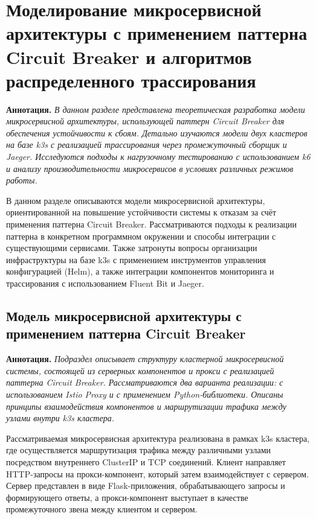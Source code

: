 \chapter{Моделирование микросервисной архитектуры с применением паттерна Circuit Breaker и алгоритмов распределенного трассирования}

\textbf{Аннотация.} \textit{В  данном разделе представлена теоретическая разработка модели микросервисной архитектуры, использующей паттерн Circuit Breaker для обеспечения устойчивости к сбоям. Детально изучаются модели двух кластеров на базе k3s с реализацией трассирования через промежуточный сборщик и Jaeger. Исследуются подходы к нагрузочному тестированию с использованием k6 и анализу производительности микросервисов в условиях различных режимов работы.}

В данном разделе описываются модели микросервисной архитектуры, ориентированной на повышение устойчивости системы к отказам за счёт применения паттерна Circuit Breaker. Рассматриваются подходы к реализации паттерна в конкретном программном окружении и способы интеграции с существующими сервисами. Также затронуты вопросы организации инфраструктуры на базе k3s с применением инструментов управления конфигурацией (Helm), а также интеграции компонентов мониторинга и трассирования с использованием Fluent Bit и Jaeger. 

  
\section{Модель микросервисной архитектуры с применением паттерна Circuit Breaker}
  
\textbf{Аннотация.} \textit{Подраздел описывает структуру кластерной микросервисной системы, состоящей из серверных компонентов и прокси с реализацией паттерна Circuit Breaker. Рассматриваются два варианта реализации: с использованием Istio Proxy и с применением Python-библиотеки. Описаны принципы взаимодействия компонентов и маршрутизации трафика между узлами внутри k3s кластера.}

Рассматриваемая микросервисная архитектура реализована в рамках k3s кластера, где осуществляется маршрутизация трафика между различными узлами посредством внутреннего ClusterIP и TCP соединений. Клиент направляет HTTP-запросы на прокси-компонент, который затем взаимодействует с сервером. Сервер представлен в виде Flask-приложения, обрабатывающего запросы и формирующего ответы, а прокси-компонент выступает в качестве промежуточного звена между клиентом и сервером.

